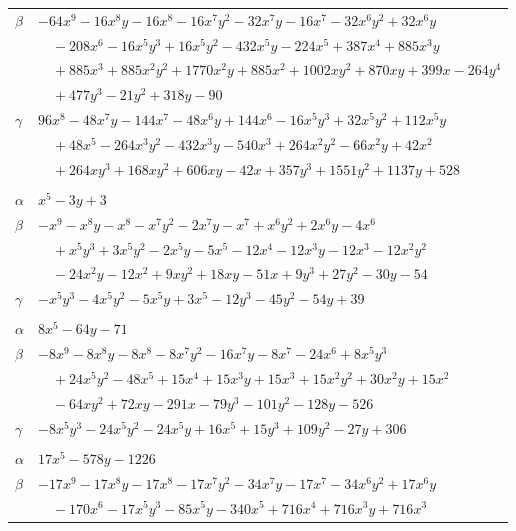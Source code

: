 \documentclass[11pt]{article}
\begin{document}
\begin{longtable}{@{}ll@{}}
$\beta$ & $-64x^{9}-16x^{8}y-16x^{8}-16x^{7}y^{2}-32x^{7}y-16x^{7}-32x^{6}y^{2}+32x^{6}y$\\
 & $\quad -208x^{6}-16x^{5}y^{3}+16x^{5}y^{2}-432x^{5}y-224x^{5}+387x^{4}+885x^{3}y$\\
 & $\quad +885x^{3}+885x^{2}y^{2}+1770x^{2}y+885x^{2}+1002xy^{2}+870xy+399x-264y^{4}$\\
 & $\quad +477y^{3}-21y^{2}+318y-90$\\
$\gamma$ & $96x^{8}-48x^{7}y-144x^{7}-48x^{6}y+144x^{6}-16x^{5}y^{3}+32x^{5}y^{2}+112x^{5}y$\\
 & $\quad +48x^{5}-264x^{3}y^{2}-432x^{3}y-540x^{3}+264x^{2}y^{2}-66x^{2}y+42x^{2}$\\
 & $\quad +264xy^{3}+168xy^{2}+606xy-42x+357y^{3}+1551y^{2}+1137y+528$\\
\addlinespace[3pt]
\multicolumn{2}{@{}l}{$\{i,j\}=\{10,26\}$, $k_{ij}=2^{5}\cdot 3$}\\
$\alpha$ & $x^{5}-3y+3$\\
$\beta$ & $-x^{9}-x^{8}y-x^{8}-x^{7}y^{2}-2x^{7}y-x^{7}+x^{6}y^{2}+2x^{6}y-4x^{6}$\\
 & $\quad +x^{5}y^{3}+3x^{5}y^{2}-2x^{5}y-5x^{5}-12x^{4}-12x^{3}y-12x^{3}-12x^{2}y^{2}$\\
 & $\quad -24x^{2}y-12x^{2}+9xy^{2}+18xy-51x+9y^{3}+27y^{2}-30y-54$\\
$\gamma$ & $-x^{5}y^{3}-4x^{5}y^{2}-5x^{5}y+3x^{5}-12y^{3}-45y^{2}-54y+39$\\
\addlinespace[3pt]
\multicolumn{2}{@{}l}{$\{i,j\}=\{10,27\}$, $k_{ij}=5\cdot 7\cdot 13$}\\
$\alpha$ & $8x^{5}-64y-71$\\
$\beta$ & $-8x^{9}-8x^{8}y-8x^{8}-8x^{7}y^{2}-16x^{7}y-8x^{7}-24x^{6}+8x^{5}y^{3}$\\
 & $\quad +24x^{5}y^{2}-48x^{5}+15x^{4}+15x^{3}y+15x^{3}+15x^{2}y^{2}+30x^{2}y+15x^{2}$\\
 & $\quad -64xy^{2}+72xy-291x-79y^{3}-101y^{2}-128y-526$\\
$\gamma$ & $-8x^{5}y^{3}-24x^{5}y^{2}-24x^{5}y+16x^{5}+15y^{3}+109y^{2}-27y+306$\\
\addlinespace[3pt]
\multicolumn{2}{@{}l}{$\{i,j\}=\{10,33\}$, $k_{ij}=2^{5}\cdot 3^{4}$}\\
$\alpha$ & $17x^{5}-578y-1226$\\
$\beta$ & $-17x^{9}-17x^{8}y-17x^{8}-17x^{7}y^{2}-34x^{7}y-17x^{7}-34x^{6}y^{2}+17x^{6}y$\\
 & $\quad -170x^{6}-17x^{5}y^{3}-85x^{5}y-340x^{5}+716x^{4}+716x^{3}y+716x^{3}$\\

\end{longtable}
\end{document}
